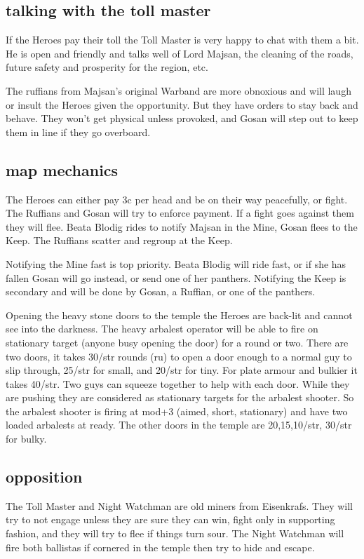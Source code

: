 \subsection*{talking with the toll master}
If the Heroes pay their toll the Toll Master is very happy to chat with them a bit. He is open and friendly and talks well of Lord Majsan, the cleaning of the roads, future safety and prosperity for the region, etc.

The ruffians from Majsan's original Warband are more obnoxious and will laugh or insult the Heroes given the opportunity. But they have orders to stay back and behave. They won't get physical unless provoked, and Gosan will step out to keep them in line if they go overboard.


\subsection*{map mechanics}
The Heroes can either pay 3c per head and be on their way peacefully, or fight. The Ruffians and Gosan will try to enforce payment. If a fight goes against them they will flee. Beata Blodig rides to notify Majsan in the Mine, Gosan flees to the Keep. The Ruffians scatter and regroup at the Keep.

Notifying the Mine fast is top priority. Beata Blodig will ride fast, or if she has fallen Gosan will go instead, or send one of her panthers. Notifying the Keep is secondary and will be done by Gosan, a Ruffian, or one of the panthers.

Opening the heavy stone doors to the temple the Heroes are back-lit and cannot see into the darkness. The heavy arbalest operator will be able to fire on stationary target (anyone busy opening the door) for a round or two. There are two doors, it takes 30/str rounds (ru) to open a door enough to a normal guy to slip through, 25/str for small, and 20/str for tiny. For plate armour and bulkier it takes 40/str. Two guys can squeeze together to help with each door. While they are pushing they are considered as stationary targets for the arbalest shooter. So the arbalest shooter is firing at mod+3 (aimed, short, stationary) and have two loaded arbalests at ready.
The other doors in the temple are 20,15,10/str, 30/str for bulky.


\subsection*{opposition}
The Toll Master and Night Watchman are old miners from Eisenkrafs. They will try to not engage unless they are sure they can win, fight only in supporting fashion, and they will try to flee if things turn sour. The Night Watchman will fire both ballistas if cornered in the temple then try to hide and escape.

